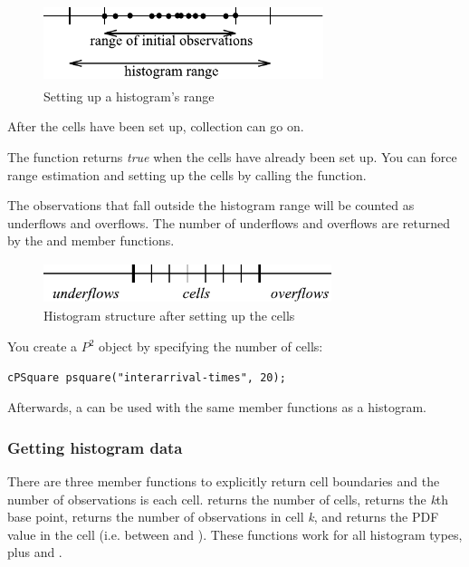 \begin{figure}[htbp]
  \begin{center}
    \includegraphics[width=3.215in, height=0.930in]{figures/usmanFig12}
    \caption{Setting up a histogram's range}
  \end{center}
\end{figure}

After the cells have been set up, collection can go on.

The  function returns \textit{true} when the cells have
already been set up. You can force range estimation and setting
up the cells by calling the  function.

The observations that fall outside the histogram range will be counted
as underflows and overflows. The number of underflows and overflows
are returned by the  and 
member functions.

\begin{figure}[htbp]
\begin{center}
  \includegraphics[width=3.310in, height=0.467in]{figures/usmanFig13}
  \caption{Histogram structure after setting up the cells}
\end{center}
\end{figure}

You create a $P^{2}$ object by specifying the number of cells:

\begin{verbatim}
cPSquare psquare("interarrival-times", 20);
\end{verbatim}

Afterwards, a  can be used with the same member functions
as a histogram.


\subsubsection{Getting histogram data}


There are three member functions to explicitly return cell boundaries
and the number of observations is each cell.  returns
the number of cells,  returns the
\textit{k}th base point,  returns the
number of observations in cell \textit{k}, and
 returns the PDF value in the cell
(i.e. between  and
).  These functions work for all
histogram types, plus  and .

